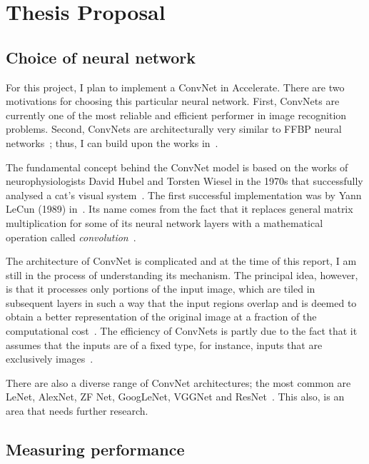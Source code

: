 
\chapter{Thesis Proposal}\label{ch:style}

\section{Choice of neural network} \label{se:mainproposal}

For this project, I plan to implement a ConvNet in Accelerate. There are two motivations for choosing this particular neural network. First, ConvNets are currently one of the most reliable and efficient performer in image recognition problems. Second, ConvNets are architecturally very similar to FFBP neural networks~\cite{Kar16}; thus, I can build upon the works in~\cite{Eve16}. 

The fundamental concept behind the ConvNet model is based on the works of neurophysiologists David Hubel and Torsten Wiesel in the 1970s that successfully analysed a cat's visual system~\cite{Goo16}. The first successful implementation was by Yann LeCun (1989) in~\cite{Lec89}. Its name comes from the fact that it replaces general matrix multiplication for some of its neural network layers with a mathematical operation called \textit{convolution}~\cite{Goo16}.

The architecture of ConvNet is complicated and at the time of this report, I am still in the process of understanding its mechanism. The principal idea, however, is that it processes only portions of the input image, which are tiled in subsequent layers in such a way that the input regions overlap and is deemed to obtain a better representation of the original image at a fraction of the computational cost~\cite{Goo16}. The efficiency of ConvNets is partly due to the fact that it assumes that the inputs are of a fixed type, for instance, inputs that are exclusively images~\cite{Kar16}. 

There are also a diverse range of ConvNet architectures; the most common are LeNet, AlexNet, ZF Net, GoogLeNet, VGGNet and ResNet~\cite{Kar16}. This also, is an area that needs further research.

\section{Measuring performance} \label{se:measuringperf}

